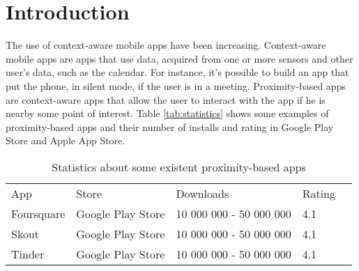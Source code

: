 
%
%

\section{Introduction}
\label{sec:introduction}


The use of context-aware mobile apps have been increasing.
Context-aware mobile apps are apps that use data, acquired
from one or more sensors and other user's data, 
such as the calendar. For instance, it's possible to
build an app that put the phone, in silent mode, if the
user is in a meeting. Proximity-based apps are
context-aware apps that allow the user to interact
with the app if he is nearby some point of interest.
Table \ref{tab:statistics} shows some examples of proximity-based
apps and their number of installs and rating in Google
Play Store and Apple App Store. 
\begin{table}[h]
\label{tab:statistics}
\centering
\begin{tabular}{|l|l|l|l|l}
\cline{1-4}
App & Store & Downloads & \multicolumn{1}{c|}{Rating} &  \\ \cline{1-4}
Foursquare & Google Play Store & 10 000 000 - 50 000 000 & 4.1 &  \\ \cline{1-4}
Skout & Google Play Store & 10 000 000 - 50 000 000 & 4.1 &  \\ \cline{1-4}
Tinder & Google Play Store & 10 000 000 - 50 000 000 & 4.1 &  \\ \hline
\end{tabular}
\caption{Statistics about some existent proximity-based apps}
\label{my-label}
\end{table}

